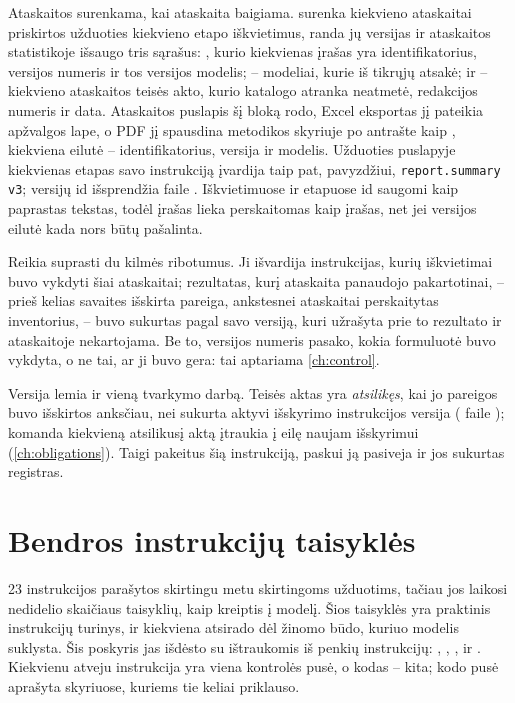 Ataskaitos  surenkama, kai ataskaita baigiama.  surenka
kiekvieno ataskaitai priskirtos užduoties kiekvieno etapo iškvietimus, randa jų versijas ir
ataskaitos statistikoje išsaugo tris sąrašus: , kurio kiekvienas įrašas yra
identifikatorius, versijos numeris ir tos versijos modelis;  -- modeliai, kurie
iš tikrųjų atsakė; ir  -- kiekvieno ataskaitos teisės akto, kurio katalogo atranka
neatmetė, redakcijos numeris ir data. Ataskaitos puslapis šį bloką rodo, Excel eksportas jį
pateikia apžvalgos lape, o PDF jį spausdina metodikos skyriuje po antrašte  kaip
, kiekviena eilutė -- identifikatorius, versija ir modelis. Užduoties
puslapyje kiekvienas etapas savo instrukciją įvardija taip pat, pavyzdžiui,
\texttt{report.summary v3}; versijų id išsprendžia  faile
. Iškvietimuose ir etapuose id saugomi kaip paprastas tekstas,
todėl įrašas lieka perskaitomas kaip įrašas, net jei versijos eilutė kada nors būtų pašalinta.

Reikia suprasti du kilmės ribotumus. Ji išvardija instrukcijas, kurių iškvietimai buvo
vykdyti šiai ataskaitai; rezultatas, kurį ataskaita panaudojo pakartotinai, -- prieš kelias
savaites išskirta pareiga, ankstesnei ataskaitai perskaitytas inventorius, -- buvo sukurtas
pagal savo versiją, kuri užrašyta prie to rezultato ir ataskaitoje nekartojama. Be to, versijos
numeris pasako, kokia formuluotė buvo vykdyta, o ne tai, ar ji buvo gera: tai aptariama
\cref{ch:control}.

Versija lemia ir vieną tvarkymo darbą. Teisės aktas yra \emph{atsilikęs}, kai jo pareigos
buvo išskirtos anksčiau, nei sukurta aktyvi išskyrimo instrukcijos versija (
faile ); komanda kiekvieną atsilikusį aktą įtraukia į eilę naujam
išskyrimui (\cref{ch:obligations}). Taigi pakeitus šią instrukciją, paskui ją pasiveja ir jos
sukurtas registras.


\section{Bendros instrukcijų taisyklės}\label{sec:prompts:conventions}

23 instrukcijos parašytos skirtingu metu skirtingoms užduotims, tačiau jos laikosi nedidelio
skaičiaus taisyklių, kaip kreiptis į modelį. Šios taisyklės yra praktinis instrukcijų turinys,
ir kiekviena atsirado dėl žinomo būdo, kuriuo modelis suklysta. Šis poskyris jas išdėsto su
ištraukomis iš penkių instrukcijų: , ,
,  ir
. Kiekvienu atveju instrukcija yra viena kontrolės pusė, o kodas --
kita; kodo pusė aprašyta skyriuose, kuriems tie keliai priklauso.

